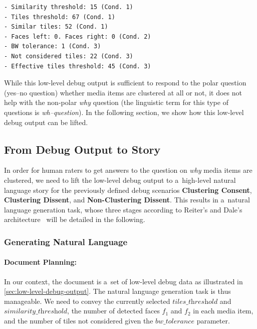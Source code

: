 \begin{verbatim}
- Similarity threshold: 15 (Cond. 1)
- Tiles threshold: 67 (Cond. 1)
- Similar tiles: 52 (Cond. 1)
- Faces left: 0. Faces right: 0 (Cond. 2)
- BW tolerance: 1 (Cond. 3)
- Not considered tiles: 22 (Cond. 3)
- Effective tiles threshold: 45 (Cond. 3)
\end{verbatim}

While this low-level debug output is sufficient to respond
to the polar question (yes--no question) whether media items
are clustered at all or not, it does not help with
the non-polar \emph{why} question
(the linguistic term for this type of questions is \emph{wh–question}).
In the following section, we show how
this low-level debug output can be lifted.

\subsection{From Debug Output to Story}
\label{sec:from-debug-output-to-story}

In order for human raters to get answers to the question on
\emph{why} media items are clustered, we need to lift the low-level debug output
to a~high-level natural language story for
the previously defined debug scenarios \textbf{Clustering Consent},
\textbf{Clustering Dissent}, and \textbf{Non-Clustering Dissent}.
This results in a~natural language generation task,
whose three stages according to Reiter's and Dale's
architecture~\cite{reiter2000building} will be detailed in the following.

\subsubsection{Generating Natural Language}
\label{sec:text-to-speech-espeak}

\paragraph{Document Planning:}

In our context, the document is a~set of low-level debug data
as illustrated in \autoref{sec:low-level-debug-output}.
The natural language generation task is thus manageable.
We need to convey the currently selected $\textit{tiles\_threshold}$
and $\textit{similarity\_threshold}$, the number of detected faces
$f_1$ and $f_2$ in each media item, and the number of tiles
not considered given the $\textit{bw\_tolerance}$ parameter.

